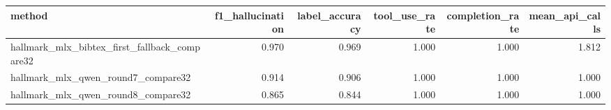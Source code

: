 \begin{tabular}{lrrrrr}
\toprule
method & f1_hallucination & label_accuracy & tool_use_rate & completion_rate & mean_api_calls \\
\midrule
hallmark\_mlx\_bibtex\_first\_fallback\_compare32 & 0.970 & 0.969 & 1.000 & 1.000 & 1.812 \\
hallmark\_mlx\_qwen\_round7\_compare32 & 0.914 & 0.906 & 1.000 & 1.000 & 1.000 \\
hallmark\_mlx\_qwen\_round8\_compare32 & 0.865 & 0.844 & 1.000 & 1.000 & 1.000 \\
\bottomrule
\end{tabular}
